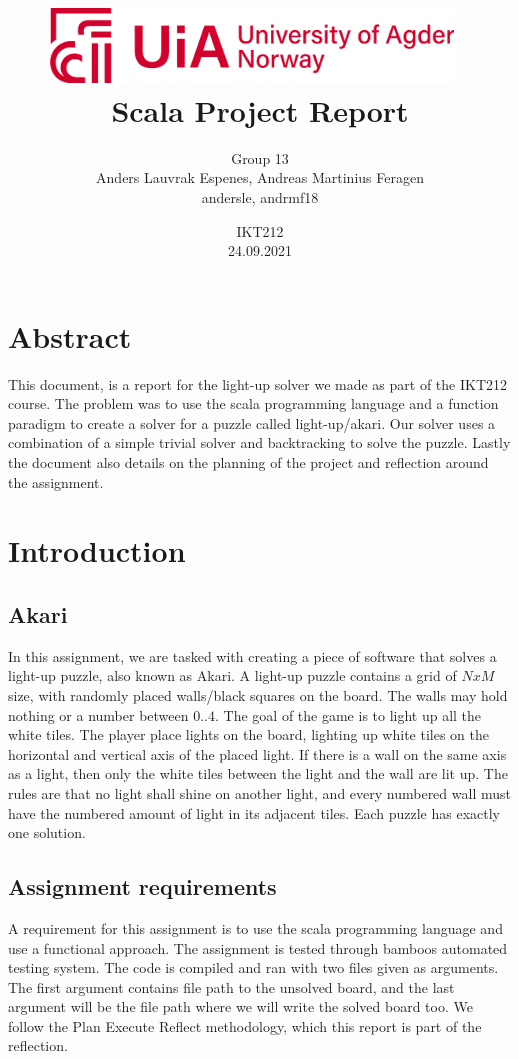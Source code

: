 \documentclass[12pt]{article}
\title{\includegraphics[width=0.8\textwidth]{uia-logo.png}~\\[1cm]
Scala Project Report}
\date{IKT212\\
24.09.2021}
\author{Group 13\\
Anders Lauvrak Espenes, Andreas Martinius Feragen\\
andersle, andrmf18}
\begin{document}
\maketitle


\section*{Abstract}
This document, is a report for the light-up solver we made as part of the IKT212 course. The problem was to use the scala programming language and a function paradigm to create a solver for a puzzle called light-up/akari. Our solver uses a combination of a simple trivial solver and backtracking to solve the puzzle. Lastly the document also details on the planning of the project and reflection around the assignment.


\newpage


\section{Introduction}
\subsection{Akari}
In this assignment, we are tasked with creating a piece of software that solves a light-up puzzle, also known as Akari. A light-up puzzle contains a grid of $NxM$ size, with randomly placed walls/black squares on the board. The walls may hold nothing or a number between $0..4$. The goal of the game is to light up all the white tiles. The player place lights on the board, lighting up white tiles on the horizontal and vertical axis of the placed light. If there is a wall on the same axis as a light, then only the white tiles between the light and the wall are lit up. The rules are that no light shall shine on another light, and every numbered wall must have the numbered amount of light in its adjacent tiles. Each puzzle has exactly one solution.

\subsection{Assignment requirements}
A requirement for this assignment is to use the scala programming language and use a functional approach. The assignment is tested through bamboos automated testing system. The code is compiled and ran with two files given as arguments. The first argument contains file path to the unsolved board, and the last argument will be the file path where we will write the solved board too. We follow the Plan Execute Reflect methodology, which this report is part of the reflection.
\end{document}
